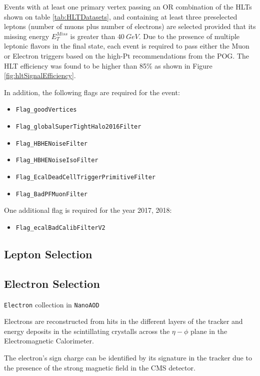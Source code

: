 Events with at least one primary vertex passing an OR combination
of the HLTs shown on table \ref{tab:HLTDatasets}, and containing at least three
preselected leptons (number of muons plus number of electrons) are selected
provided that its missing energy $E_T^{Miss}$ is greater than $40~GeV$.
Due to the presence of multiple leptonic flavors in the final state, each event
is required to pass either the Muon or Electron triggers based on the high-Pt
recommendations from the POG. The HLT efficiency was found to be higher
than 85\% as shown in Figure \ref{fig:hltSignalEfficiency}.

In addition, the following flags are required for the event:

\begin{itemize}
  \item \verb|Flag_goodVertices|
  \item \verb|Flag_globalSuperTightHalo2016Filter|
  \item \verb|Flag_HBHENoiseFilter|
  \item \verb|Flag_HBHENoiseIsoFilter|
  \item \verb|Flag_EcalDeadCellTriggerPrimitiveFilter|
  \item \verb|Flag_BadPFMuonFilter|
\end{itemize}

One additional flag is required for the year 2017, 2018:

\begin{itemize}
\item \verb|Flag_ecalBadCalibFilterV2|
\end{itemize}

\subsection{Lepton Selection}

\subsection{Electron Selection}

\verb|Electron| collection in \verb|NanoAOD|

Electrons are reconstructed from hits in the different
layers of the tracker and energy deposits in the scintillating crystalls
across the $\eta-\phi$ plane in the Electromagnetic Calorimeter.

The electron's sign charge can be identified by its signature in the tracker
due to the presence of the strong magnetic field in the CMS detector.


